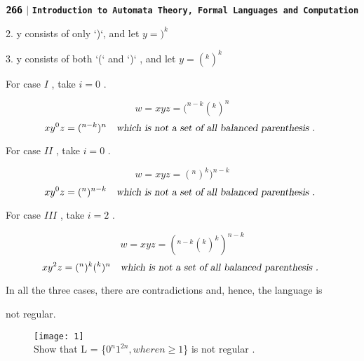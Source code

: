 \documentclass[10pt,a4paper]{book}
\begin{document}
  $\textsf{\textbf{266}}$ $|$ \texttt{\textbf{Introduction to Automata Theory, Formal Languages and Computation}}
\qquad

\footnotesize

2. y consists of only ‘)‘, and let $y =)^{k}$

3. y consists of both ‘(‘ and ‘)‘ , and let $y =(^{k})^{k}$

For case $I$ , take $i = 0$ .

$$ w = xyz = (^{n-k} (^{k} )^{n} $$
$$ xy^{0}z = (^{n-k} )^{n} \quad\textsl{which is not a set of all balanced parenthesis . }$$

For case $II$ , take $i = 0$ .

$$ w = xyz = (^{n} )^{k} )^{n-k} $$
$$ xy^{0}z = (^{n} )^{n-k} \quad\textsl{which is not a set of all balanced parenthesis . }$$

For case $III$ , take $i = 2$ .

$$ w = xyz = (^{n-k} (^{k} )^{k} )^{n-k} $$
$$ xy^{2}z = (^{n} )^{k} (^{k} )^{n} \quad\textsl{which is not a set of all balanced parenthesis . }$$

In all the three cases, there are contradictions and, hence, the language is

\;
 not regular.

\begin{flushleft}
\begin{figure}[h]
  \texttt{[image: 1]}\\Show that L = \{$ 0^{n} 1^{2n} , where n \geq 1 $\} is not regular .
\end{figure}
\end{flushleft}
\end{document}
